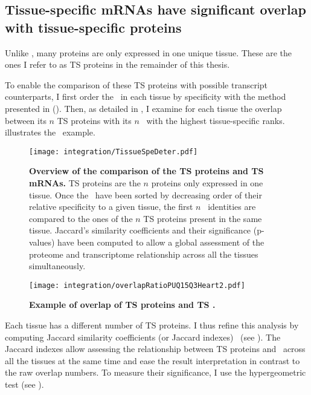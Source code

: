 \subsection{Tissue-specific \texorpdfstring{\MakeLowercase{m}RNAs}{mRNAs} %
have significant overlap with tissue-specific proteins}\label{sec:TSprotMrna}

Unlike \mRNAs,
many proteins are only expressed in one unique tissue.
These are the ones I refer to as \gls{TS} proteins in the remainder of this thesis.\mybr\

To enable the comparison of these \gls{TS} proteins with possible transcript counterparts,
I first order the \mRNAs\ in each tissue by specificity
with the method presented in 
().
Then, as detailed in ,
I examine for each tissue the overlap between its $n$ \gls{TS} proteins
with its $n$ \mRNAs\ with the highest tissue-specific ranks.
 illustrates the \heart\ example.

\begin{figure}[!htb]
    \texttt{[image: integration/TissueSpeDeter.pdf]}\centering
    \vspace{-3mm}
    \caption[Determination process of the specific mRNAs]{%
    \label{fig:RankSpe}\textbf{Overview of the comparison of the TS proteins
    and TS mRNAs.}
    \gls{TS} proteins are the $n$ proteins only expressed in one tissue.
    Once the \mRNAs\ have been sorted
    by decreasing order of their relative specificity to a given tissue,
    the first $n$ \mRNAs\ identities are compared
    to the ones of the $n$ \gls{TS} proteins present in the same tissue.
    Jaccard's similarity coefficients and their significance (p-values)
    have been computed to allow
    a global assessment of the proteome and transcriptome relationship
    across all the tissues simultaneously.
    }
\end{figure}

\begin{figure}[!htbp]
\texttt{[image: integration/overlapRatioPUQ15Q3Heart2.pdf]}\centering
\vspace{-3mm}
    \caption[Example of overlap of TS proteins and TS mRNAs for Heart]{%
    \label{fig:ExJacquard}\textbf{Example of overlap of \gls{TS} proteins
    and \gls{TS} \mRNAs.}}
\end{figure}


Each tissue has a different number of \gls{TS} proteins.
I thus refine this analysis
by computing Jaccard similarity coefficients
(or Jaccard indexes)~
(see ).
The Jaccard indexes allow assessing
the relationship between \gls{TS} proteins and \mRNAs\
across all the tissues at the same time
and ease the result interpretation in contrast to the raw overlap numbers.
To measure their significance,
I use the hypergeometric test (see ).


